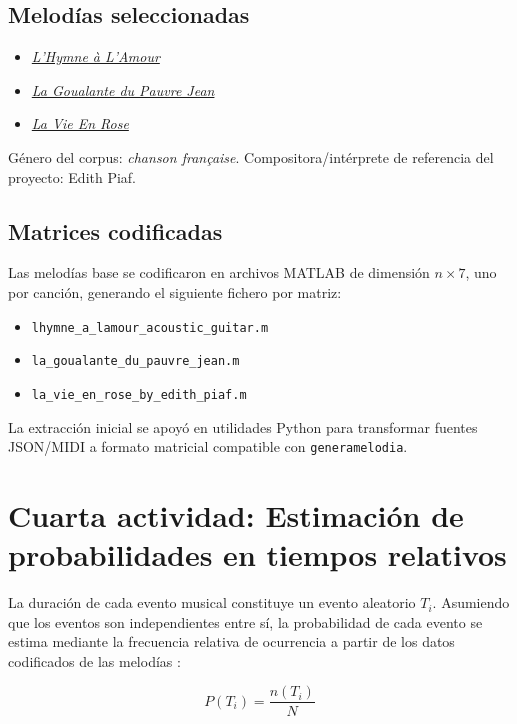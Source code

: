 \documentclass{article}
\theoremstyle{plain}
\theoremstyle{definition}
\begin{document}
\subsection*{Melodías seleccionadas}
\begin{itemize}
    \item \href{https://www.songsterr.com/a/wsa/edith-piaf-lhymne-a-lamour-tab-s33753}{\textit{L'Hymne à L'Amour}}
    \item \href{https://www.songsterr.com/a/wsa/edith-piaf-la-goualante-du-pauvre-jean-tab-s16146}{\textit{La Goualante du Pauvre Jean}}
    \item \href{https://www.songsterr.com/a/wsa/misc-covers-la-vie-en-rose-by-edith-piaf-guitar-logic-tab-s464099}{\textit{La Vie En Rose}}
\end{itemize}

Género del corpus: \textit{chanson française}. Compositora/intérprete de referencia del proyecto: Edith Piaf.

\subsection*{Matrices codificadas}
Las melodías base se codificaron en archivos MATLAB de dimensión \(n\times 7\), uno por canción, generando el siguiente fichero por matriz: 
\begin{itemize}
    \item {\texttt{lhymne\_a\_lamour\_acoustic\_guitar.m}}
    \item {\texttt{la\_goualante\_du\_pauvre\_jean.m}}
    \item {\texttt{la\_vie\_en\_rose\_by\_edith\_piaf.m}}
\end{itemize}
La extracción inicial se apoyó en utilidades Python para transformar fuentes JSON/MIDI a formato matricial compatible con \texttt{generamelodia}.

\section*{Cuarta actividad: Estimación de probabilidades en tiempos relativos}

La duración de cada evento musical constituye un evento aleatorio $T_i$. Asumiendo que los
eventos son independientes entre sí, la probabilidad de cada evento se estima mediante la
frecuencia relativa de ocurrencia a partir de los datos codificados de las melodías
\cite{bertsekas, walpole}:

\[
    P(T_i) = \frac{n(T_i)}{N}
\]
\end{document}
